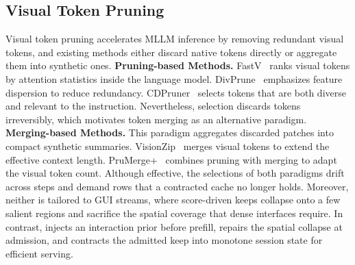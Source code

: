 \subsection{Visual Token Pruning}
Visual token pruning accelerates MLLM inference by removing redundant visual tokens, and existing methods either discard native tokens directly or aggregate them into synthetic ones.
%
\textbf{Pruning-based Methods.}
FastV~\citep{chen2024fastv} ranks visual tokens by attention statistics inside the language model.
%
DivPrune~\citep{alvar2025divprune} emphasizes feature dispersion to reduce redundancy.
%
CDPruner~\citep{zhang2025cdpruner} selects tokens that are both diverse and relevant to the instruction.
%
Nevertheless, selection discards tokens irreversibly, which motivates token merging as an alternative paradigm.
%
\textbf{Merging-based Methods.}
This paradigm aggregates discarded patches into compact synthetic summaries.
%
VisionZip~\citep{yang2025visionzip} merges visual tokens to extend the effective context length.
%
PruMerge+~\citep{shang2025prumerge} combines pruning with merging to adapt the visual token count.
%
Although effective, the selections of both paradigms drift across steps and demand rows that a contracted cache no longer holds.
%
Moreover, neither is tailored to GUI streams, where score-driven keeps collapse onto a few salient regions and sacrifice the spatial coverage that dense interfaces require.
%
In contrast, \method{} injects an interaction prior before prefill, repairs the spatial collapse at admission, and contracts the admitted keep into monotone session state for efficient serving.
